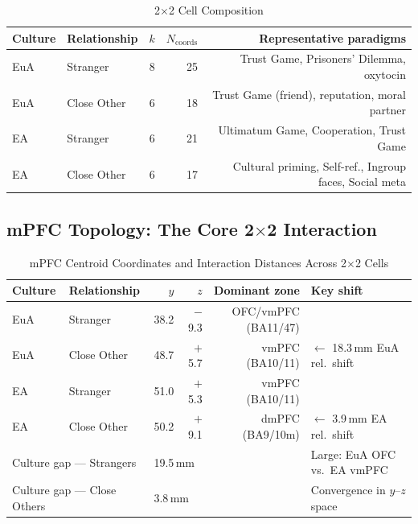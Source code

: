 \documentclass[11pt,a4paper]{article}
\begin{document}
\begin{table}[ht]
\centering\small
\caption{2$\times$2 Cell Composition}
\label{tab:2x2_pools}
\renewcommand{\arraystretch}{1.25}
\begin{tabular}{llrrr}
\toprule
\textbf{Culture} & \textbf{Relationship} & $k$ & $N_{\text{coords}}$ & Representative paradigms \\
\midrule
\textcolor{euaBlue}{EuA} & Stranger    & 8 & 25 & Trust Game, Prisoners' Dilemma, oxytocin \\
\textcolor{euaBlue}{EuA} & Close Other & 6 & 18 & Trust Game (friend), reputation, moral partner \\
\textcolor{eaRed}{EA}    & Stranger    & 6 & 21 & Ultimatum Game, Cooperation, Trust Game \\
\textcolor{eaRed}{EA}    & Close Other & 6 & 17 & Cultural priming, Self-ref., Ingroup faces, Social meta \\
\bottomrule
\end{tabular}
\end{table}

\subsection{mPFC Topology: The Core 2$\times$2 Interaction}

\begin{table}[ht]
\centering\small
\caption{mPFC Centroid Coordinates and Interaction Distances Across 2$\times$2 Cells}
\label{tab:mpfc_2x2}
\renewcommand{\arraystretch}{1.25}
\begin{tabular}{llrrrl}
\toprule
\textbf{Culture} & \textbf{Relationship} & $y$ & $z$ & \textbf{Dominant zone} & \textbf{Key shift} \\
\midrule
\textcolor{euaBlue}{EuA} & Stranger    & 38.2 & $-$9.3 & OFC/vmPFC (BA11/47) & \\
\textcolor{euaBlue}{EuA} & Close Other & 48.7 & $+$5.7 & vmPFC (BA10/11)     & $\leftarrow$ 18.3\,mm EuA rel.\ shift \\
\textcolor{eaRed}{EA}    & Stranger    & 51.0 & $+$5.3 & vmPFC (BA10/11)     & \\
\textcolor{eaRed}{EA}    & Close Other & 50.2 & $+$9.1 & dmPFC (BA9/10m)     & $\leftarrow$ 3.9\,mm EA rel.\ shift \\
\midrule
\multicolumn{2}{l}{Culture gap — Strangers}    & \multicolumn{3}{l}{19.5\,mm} & Large: EuA OFC vs.\ EA vmPFC \\
\multicolumn{2}{l}{Culture gap — Close Others} & \multicolumn{3}{l}{3.8\,mm}  & Convergence in $y$--$z$ space \\
\bottomrule
\end{tabular}
\end{table}
\end{document}
